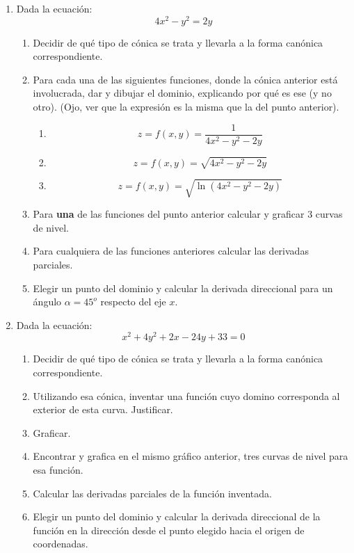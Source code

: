 \documentclass[12pt]{article}
\theoremstyle{definition}
\begin{document}
\begin{enumerate}
\item  
Dada la ecuación:
\begin{equation*}
4x^2- y^2=2y
\end{equation*} 
\begin{enumerate}
\item  Decidir de qué tipo de cónica se trata y llevarla a la forma canónica correspondiente.
\item  Para cada una de las siguientes funciones, donde la cónica anterior está involucrada, dar y dibujar el dominio, explicando por qué es ese (y no otro). (Ojo, ver que la expresión es la misma que la del punto anterior).
\begin{enumerate}
\item  
\begin{equation*}
z = f(x,y) = \frac{1}{4x^2- y^2-2y}
\end{equation*}
\item  
\begin{equation*}
z = f(x,y) = \sqrt{4x^2- y^2-2y}
\end{equation*}
\item  
\begin{equation*}
z = f(x,y) = \sqrt{\ln{(4x^2- y^2-2y)}}
\end{equation*}
\end{enumerate}
\item Para \textbf{una} de las funciones del punto anterior calcular y graficar 3 curvas de nivel.
\item Para cualquiera de las funciones anteriores calcular las derivadas parciales.
\item Elegir un punto del dominio y calcular la derivada direccional para un ángulo $\alpha=45^o$ respecto del eje $x$.
\end{enumerate}

\item  
Dada la ecuación:
\begin{equation*}
x^2+4y^2+2x-24y+33=0
\end{equation*} 
\begin{enumerate}
\item  Decidir de qué tipo de cónica se trata y llevarla a la forma canónica correspondiente.
\item  Utilizando esa cónica, inventar una función cuyo domino corresponda al exterior de esta curva. Justificar. 
\item Graficar.
\item Encontrar y grafica en el mismo gráfico anterior, tres curvas de nivel para esa función.
\item Calcular las derivadas parciales de la función inventada.
\item Elegir un punto del dominio  y calcular  la derivada direccional de la función en la dirección desde el punto elegido hacia el origen de coordenadas.
\end{enumerate}


\end{enumerate}
\end{document}
